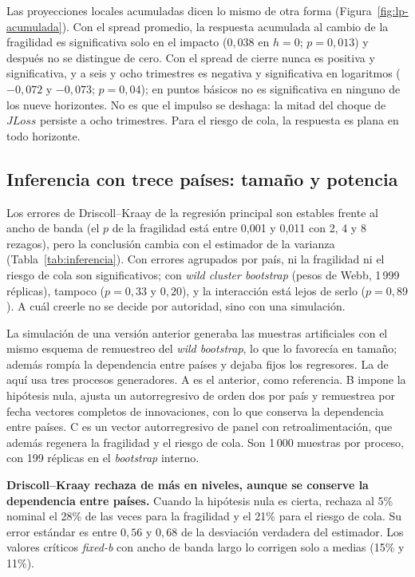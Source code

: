 Las proyecciones locales acumuladas dicen lo mismo de otra forma (Figura~\ref{fig:lp-acumulada}). Con el spread promedio, la respuesta acumulada al cambio de la fragilidad es significativa solo en el impacto ($0{,}038$ en $h=0$; $p=0{,}013$) y después no se distingue de cero. Con el spread de cierre nunca es positiva y significativa, y a seis y ocho trimestres es negativa y significativa en logaritmos ($-0{,}072$ y $-0{,}073$; $p=0{,}04$); en puntos básicos no es significativa en ninguno de los nueve horizontes. No es que el impulso se deshaga: la mitad del choque de $JLoss$ persiste a ocho trimestres. Para el riesgo de cola, la respuesta es plana en todo horizonte.


\subsection{Inferencia con trece países: tamaño y potencia}
\label{sec:inferencia-potencia}

Los errores de Driscoll--Kraay de la regresión principal son estables frente al ancho de banda (el $p$ de la fragilidad está entre 0,001 y 0,011 con 2, 4 y 8 rezagos), pero la conclusión cambia con el estimador de la varianza (Tabla~\ref{tab:inferencia}). Con errores agrupados por país, ni la fragilidad ni el riesgo de cola son significativos; con \textit{wild cluster bootstrap} (pesos de Webb, 1\,999 réplicas), tampoco ($p=0{,}33$ y $0{,}20$), y la interacción está lejos de serlo ($p=0{,}89$). A cuál creerle no se decide por autoridad, sino con una simulación.

La simulación de una versión anterior generaba las muestras artificiales con el mismo esquema de remuestreo del \textit{wild bootstrap}, lo que lo favorecía en tamaño; además rompía la dependencia entre países y dejaba fijos los regresores. La de aquí usa tres procesos generadores. A es el anterior, como referencia. B impone la hipótesis nula, ajusta un autorregresivo de orden dos por país y remuestrea por fecha vectores completos de innovaciones, con lo que conserva la dependencia entre países. C es un vector autorregresivo de panel con retroalimentación, que además regenera la fragilidad y el riesgo de cola. Son 1\,000 muestras por proceso, con 199 réplicas en el \textit{bootstrap} interno.


\textbf{Driscoll--Kraay rechaza de más en niveles, aunque se conserve la dependencia entre países.} Cuando la hipótesis nula es cierta, rechaza al 5\% nominal el 28\% de las veces para la fragilidad y el 21\% para el riesgo de cola. Su error estándar es entre $0{,}56$ y $0{,}68$ de la desviación verdadera del estimador. Los valores críticos \textit{fixed-b} con ancho de banda largo lo corrigen solo a medias (15\% y 11\%).

